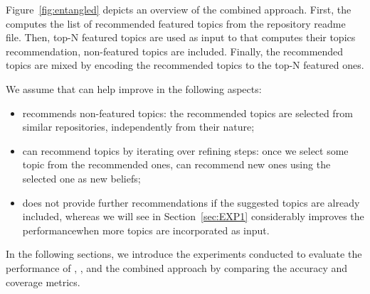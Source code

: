 Figure~\ref{fig:entangled} depicts an overview of the combined approach. First, the \MNB computes the list of recommended featured topics from the repository readme file. Then, top-N featured topics are used as input to \TF that computes their topics recommendation, \ie non-featured topics are included. Finally, the recommended topics are mixed by encoding the \TF recommended topics to the top-N featured ones.

We assume that \TF can help improve \MNB in the following aspects:
\begin{itemize}
	\item \TF recommends non-featured topics: the recommended topics are selected from similar repositories, independently from their nature;
	\item \TF can recommend topics by iterating over refining steps: once we select some topic from the recommended ones, \TF can recommend new ones using the selected one as new beliefs;
	\item \MNB does not provide further recommendations if the suggested topics are already included, whereas we will see in Section~\ref{sec:EXP1} \TF considerably improves the performancewhen more topics are incorporated as input.
\end{itemize}

In the following sections, we introduce the experiments conducted to evaluate the performance of \TF, \MNB, and the combined approach by comparing the accuracy and coverage metrics.

